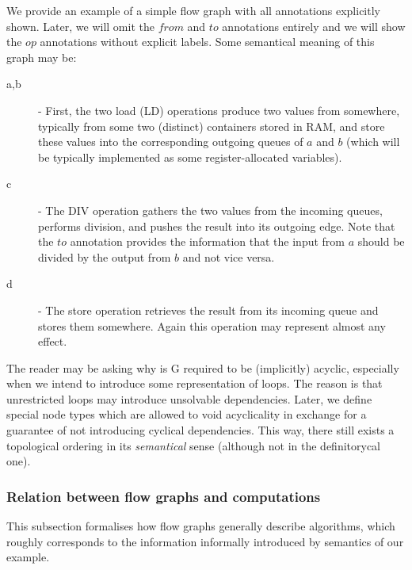
  We provide an example of a simple flow graph with all annotations explicitly shown. Later, we will omit the $from$ and $to$ annotations entirely and we will show the $op$ annotations without explicit labels. Some semantical meaning of this graph may be:

  \begin{description}
  \item[a,b] - First, the two load (LD) operations produce two values from somewhere, typically from some two (distinct) containers stored in RAM, and store these values into the corresponding outgoing queues of $a$ and $b$ (which will be typically implemented as some register-allocated variables). 
  \item[c] - The DIV operation gathers the two values from the incoming queues, performs division, and pushes the result into its outgoing edge. Note that the $to$ annotation provides the information that the input from $a$ should be divided by the output from $b$ and not vice versa.
  \item[d] - The store operation retrieves the result from its incoming queue and stores them somewhere. Again this operation may represent almost any effect.
  \end{description}

\begin{rem}
  The reader may be asking why is G required to be (implicitly) acyclic, especially when we intend to introduce some representation of loops. The reason is that unrestricted loops may introduce unsolvable dependencies. Later, we define special node types which are allowed to void acyclicality in exchange for a guarantee of not introducing cyclical dependencies. This way, there still exists a topological ordering in its \emph{semantical} sense (although not in the definitorycal one). 
\end{rem}

\subsubsection{Relation between flow graphs and computations}

  This subsection formalises how flow graphs generally describe algorithms, which roughly corresponds to the information informally introduced by semantics of our example.


